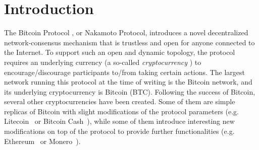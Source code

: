 
\section{Introduction}

The Bitcoin Protocol \cite{Bitcoin,DBLP:books/daglib/0040621,NC17}, or Nakamoto Protocol, introduces a novel decentralized network-consensus mechanism that is trustless and open for anyone connected to the Internet. To support such an open and dynamic topology, the protocol requires an underlying currency (a so-called \emph{cryptocurrency} \cite{NC17}) to encourage/discourage participants to/from taking certain actions. The largest network running this protocol at the time of writing is the Bitcoin network, and its underlying cryptocurrency is Bitcoin (BTC). Following the success of Bitcoin, several other cryptocurrencies have been created. Some of them are simple replicas of Bitcoin with slight modifications of the protocol parameters (e.g. Litecoin~\cite{Litecoin} or Bitcoin Cash~\cite{Bcash}), while some of them introduce interesting new modifications on top of the protocol to provide further functionalities (e.g. Ethereum~\cite{Ethereum,E17} or Monero~\cite{Monero}).


